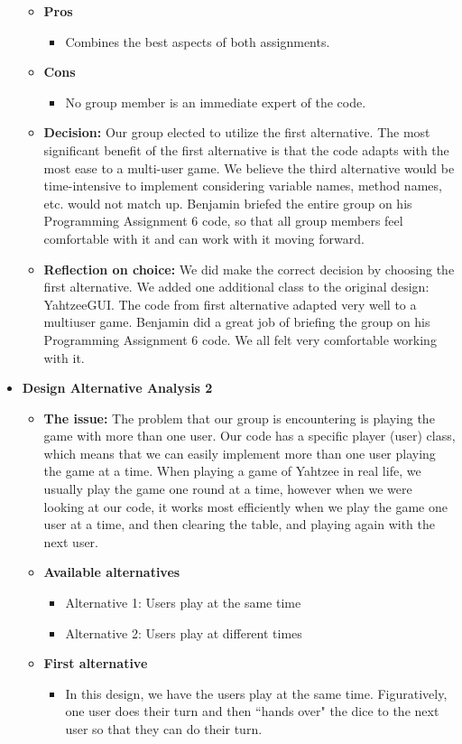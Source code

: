 \documentclass[]{report}   %
\begin{document}
\begin{itemize}
\begin{itemize}
\begin{itemize}
		\end{itemize}
	\item \textbf{Pros}
		\begin{itemize}
		\item Combines the best aspects of both assignments.
		\end{itemize}
	\item \textbf{Cons}
		\begin{itemize}
		\item No group member is an immediate expert of the code.
		\end{itemize}
	\item \textbf{Decision:} Our group elected to utilize the first alternative. The most significant benefit of the first alternative is that the code adapts with the most ease to a multi-user game. We believe the third alternative would be time-intensive to implement considering variable names, method names, etc. would not match up. Benjamin briefed the entire group on his Programming Assignment 6 code, so that all group members feel comfortable with it and can work with it moving forward.
	\item \textbf{Reflection on choice:} We did make the correct decision by choosing the first alternative. We added one additional class to the original design: YahtzeeGUI. The code from first alternative adapted very well to a multiuser game. Benjamin did a great job of briefing the group on his Programming Assignment 6 code. We all felt very comfortable working with it. \\
	\end{itemize}
	
	\vspace {.5in}
	
\item \textbf{Design Alternative Analysis 2}
	\begin{itemize}
	\item \textbf{The issue:} The problem that our group is encountering is playing the game with more than one user. Our code has a specific player (user) class, which means that we can easily implement more than one user playing the game at a time. When playing a game of Yahtzee in real life, we usually play the game one round at a time, however when we were looking at our code, it works most efficiently when we play the game one user at a time, and then clearing the table, and playing again with the next user.
	\item \textbf{Available alternatives}
		\begin{itemize}
		\item Alternative 1: Users play at the same time
		\item Alternative 2: Users play at different times
		\end{itemize}
	\item \textbf{First alternative}
		\begin{itemize}
		\item In this design, we have the users play at the same time. Figuratively, one user does their turn and then ``hands over" the dice to the next user so that they can do their turn.
		\end{itemize}
		

\end{itemize}
\end{itemize}
\end{document}
